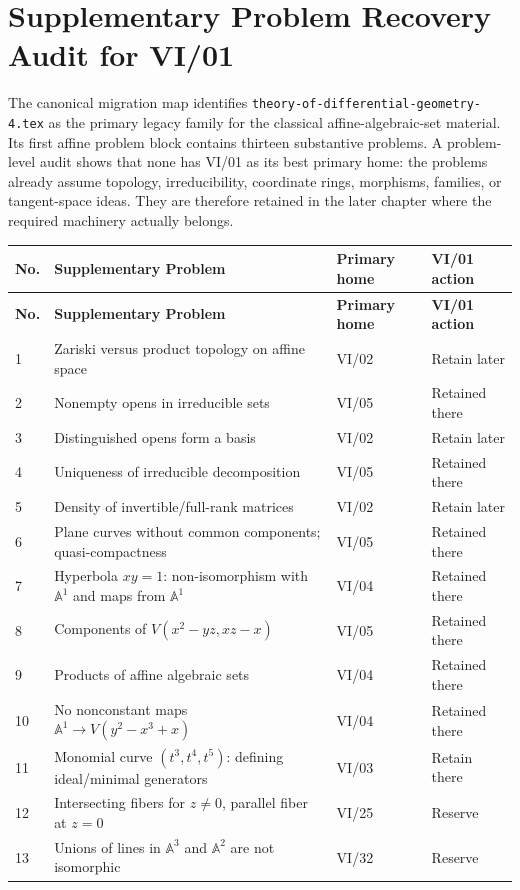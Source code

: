\chapter*{Supplementary Problem Recovery Audit for VI/01}

The canonical migration map identifies
\texttt{theory-of-differential-geometry-4.tex} as the primary legacy family for the
classical affine-algebraic-set material.  Its first affine problem block contains thirteen
substantive problems.  A problem-level audit shows that none has VI/01 as its best primary
home: the problems already assume topology, irreducibility, coordinate rings, morphisms,
families, or tangent-space ideas.  They are therefore retained in the later chapter where
the required machinery actually belongs.

\begin{longtable}{@{}p{}p{}p{}p{}@{}}
\toprule
\textbf{No.} & \textbf{Supplementary Problem} & \textbf{Primary home} & \textbf{VI/01 action}\\
\midrule
\endfirsthead
\toprule
\textbf{No.} & \textbf{Supplementary Problem} & \textbf{Primary home} & \textbf{VI/01 action}\\
\midrule
\endhead
1 & Zariski versus product topology on affine space & VI/02 & Retain later\\
2 & Nonempty opens in irreducible sets & VI/05 & Retained there\\
3 & Distinguished opens form a basis & VI/02 & Retain later\\
4 & Uniqueness of irreducible decomposition & VI/05 & Retained there\\
5 & Density of invertible/full-rank matrices & VI/02 & Retain later\\
6 & Plane curves without common components; quasi-compactness & VI/05 & Retained there\\
7 & Hyperbola \(xy=1\): non-isomorphism with \(\mathbb A^1\) and maps from \(\mathbb A^1\) & VI/04 & Retained there\\
8 & Components of \(V(x^2-yz,xz-x)\) & VI/05 & Retained there\\
9 & Products of affine algebraic sets & VI/04 & Retained there\\
10 & No nonconstant maps \(\mathbb A^1\to V(y^2-x^3+x)\) & VI/04 & Retained there\\
11 & Monomial curve \((t^3,t^4,t^5)\): defining ideal/minimal generators & VI/03 & Retain there\\
12 & Intersecting fibers for \(z\neq0\), parallel fiber at \(z=0\) & VI/25 & Reserve\\
13 & Unions of lines in \(\mathbb A^3\) and \(\mathbb A^2\) are not isomorphic & VI/32 & Reserve\\
\bottomrule
\end{longtable}

